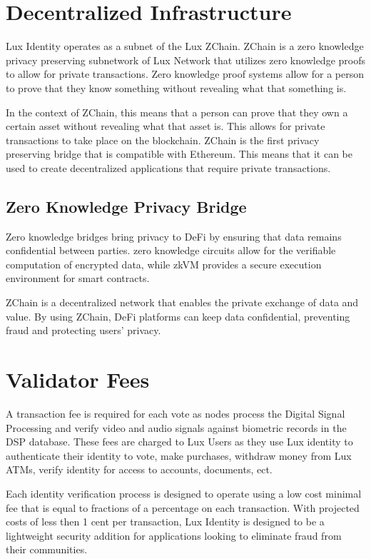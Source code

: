 \documentclass[11pt]{article}
\begin{document}
\section{Decentralized Infrastructure}

Lux Identity operates as a subnet of the Lux ZChain. ZChain is a zero knowledge privacy preserving subnetwork of Lux Network that utilizes zero knowledge proofs to allow for private transactions. Zero knowledge proof systems allow for a person to prove that they know something without revealing what that something is.


In the context of ZChain, this means that a person can prove that they own a certain asset without revealing what that asset is. This allows for private transactions to take place on the blockchain. ZChain is the first privacy preserving bridge that is compatible with Ethereum. This means that it can be used to create decentralized applications that require private transactions.


\subsection{Zero Knowledge Privacy Bridge}

Zero knowledge bridges bring privacy to DeFi by ensuring that data remains confidential between parties. zero knowledge circuits allow for the verifiable computation of encrypted data, while zkVM provides a secure execution environment for smart contracts.


ZChain is a decentralized network that enables the private exchange of data and value. By using ZChain, DeFi platforms can keep data confidential, preventing fraud and protecting users' privacy.


\section{Validator Fees}

A transaction fee is required for each vote as nodes process the Digital Signal Processing and verify video and audio signals against biometric records in the DSP database. These fees are charged to Lux Users as they use Lux identity to authenticate their identity to vote, make purchases, withdraw money from Lux ATMs, verify identity for access to accounts, documents, ect.


Each identity verification process is designed to operate using a low cost minimal fee that is equal to fractions of a percentage on each transaction.  With projected costs of less then 1 cent per transaction, Lux Identity is designed to be a lightweight security addition for applications looking to eliminate fraud from their communities.
\end{document}
